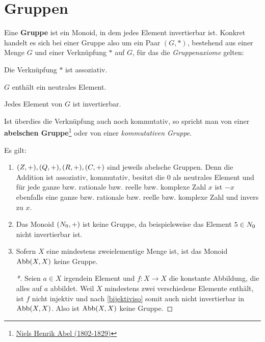 \section{Gruppen}


\begin{defin}[Gruppe]  
    Eine \textbf{Gruppe} ist ein Monoid, in dem jedes Element invertierbar ist. Konkret handelt es sich bei einer Gruppe also um ein Paar $(G,*)$, bestehend aus einer Menge $G$ und einer Verknüpfung $*$ auf $G$, für das die \emph{Gruppenaxiome} gelten:
    \begin{labeling}[(G1), labelindent=1.5em]
        \item Die Verknüpfung $*$ ist assoziativ.
        \item $G$ enthält ein neutrales Element.
        \item Jedes Element von $G$ ist invertierbar.
    \end{labeling}
    Ist überdies die Verknüpfung auch noch kommutativ, so spricht man von einer \textbf{abelschen Gruppe}\footnote{\href{https://de.wikipedia.org/wiki/Niels_Henrik_Abel}{Niels Henrik Abel (1802-1829)}} oder von einer \emph{kommutativen Gruppe}.
\end{defin}


\begin{bsp}
    Es gilt:
    \begin{enumerate}
        \item $(\relax Z,+),(\relax Q,+),(\relax R,+),(\relax C,+)$ sind jeweils abelsche Gruppen. Denn die Addition ist assoziativ, kommutativ, besitzt die $0$ als neutrales Element und für jede ganze bzw. rationale bzw. reelle bzw. komplexe Zahl $x$ ist $-x$ ebenfalls eine ganze bzw. rationale bzw. reelle bzw. komplexe Zahl und invers zu $x$.
        \item Das Monoid $(\relax N_0,+)$ ist keine Gruppe, da beispielsweise das Element $5\in \relax N_0$ nicht invertierbar ist.
        \item Sofern $X$ eine mindestens zweielementige Menge ist, ist das Monoid $\operatorname{Abb}(X,X)$ keine Gruppe.
        \begin{proof}[*]
            Seien $a\in X$ irgendein Element und $f:X\to X$ die konstante Abbildung, die alles auf $a$ abbildet. Weil $X$ mindestens zwei verschiedene Elemente enthält, ist $f$ nicht injektiv und nach \cref{bijektiviso} somit auch nicht invertierbar in $\operatorname{Abb}(X,X)$. Also ist $\operatorname{Abb}(X,X)$ keine Gruppe.
        \end{proof}
    \end{enumerate}
\end{bsp}


